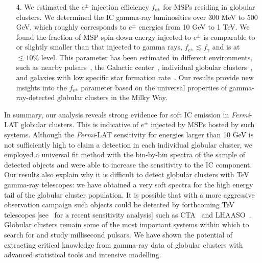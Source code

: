 \documentclass[doublespace,nopageskip]{VTthesis}
\begin{document}
\begin{itemize}
    \item[4.] We estimated the $e^\pm$ injection efficiency $f_{e^\pm}$ for MSPs residing in globular clusters. We determined the IC gamma-ray luminosities over 300 MeV to 500 GeV, which roughly corresponds to $e^\pm$ energies from 10 GeV to 1 TeV. We found the fraction of MSP spin-down energy injected to $e^\pm$ is comparable to or slightly smaller than that injected to gamma rays, $f_{e^\pm} \lesssim f_\gamma$ and is at $\lesssim 10\%$ level. This parameter has been estimated in different environments, such as {nearby pulsars~\citep{2017PhRvD..96j3013H, 2018PhRvD..98d3005H, 2021arXiv210400014H}}, the Galactic center~\citep{2013MNRAS.435L..14B}, individual globular clusters~\citep{2019MNRAS.484.2876M}, and galaxies with low specific star formation rate~\citep{2020arXiv200508982S}. Our results provide new insights into the $f_{e^\pm}$ parameter based on the universal properties of gamma-ray-detected globular clusters in the Milky Way.
\end{itemize}

In summary, our analysis reveals strong evidence for {soft} IC emission in \textit{Fermi}-LAT globular clusters. This is indicative of $e^\pm$ injected by MSPs hosted by such systems. Although the {\it Fermi}-LAT sensitivity for energies larger than 10 GeV is not sufficiently high to claim a detection in each individual globular cluster, we employed a universal fit method with the bin-by-bin spectra of the sample of detected objects and were able to increase the sensitivity to the IC component. Our results also explain why it is difficult to detect globular clusters with TeV gamma-ray telescopes: we have obtained a very soft spectra for the high energy tail of the globular cluster population. It is possible that with a more aggressive observation campaign such objects could be detected by forthcoming TeV telescopes [see~\citep{2018MNRAS.473..897N} for a recent sensitivity analysis] such as CTA~\citep{2019scta.book.....C} and LHAASO~\citep{2019arXiv190502773B}. Globular clusters remain some of the most important systems within which to search for and study millisecond pulsars. We have shown the potential of extracting critical knowledge from gamma-ray data of globular clusters with advanced statistical tools and intensive modelling. 

\end{document}
